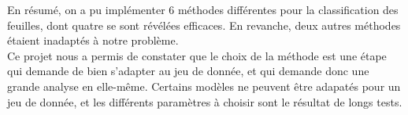 En résumé, on a pu implémenter 6 méthodes différentes pour la classification des feuilles, dont quatre se sont révélées efficaces. En revanche, deux autres méthodes étaient inadaptés à notre problème.\\

Ce projet nous a permis de constater que le choix de la méthode est une étape qui demande de bien s'adapter au jeu de donnée, et qui demande donc une grande analyse en elle-même. Certains modèles ne peuvent être adapatés pour un jeu de donnée, et les différents paramètres à choisir sont le résultat de longs tests.